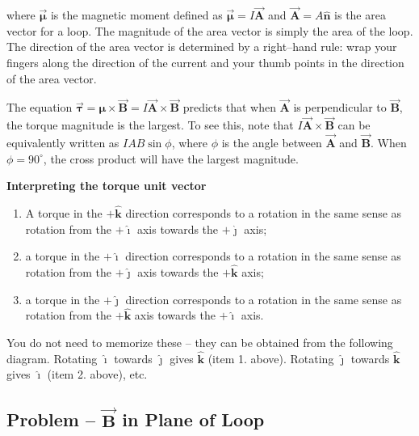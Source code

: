 \documentclass{article}
\newcommand{\ihat}[0]{\hat{\boldsymbol{\imath}}}
\newcommand{\jhat}[0]{\hat{\boldsymbol{\jmath}}}
\newcommand{\khat}[0]{\hat{\boldsymbol{k}}}
\newcommand{\bfvec}[1]{\vec{\mathbf{#1}}}
\begin{document}
where $\vec{\boldsymbol{\mu}}$ is the magnetic moment defined as $\vec{\boldsymbol{\mu}}=I\bfvec{A}$ and $\bfvec{A}=A\hat{\mathbf{n}}$ is the area vector for a loop. The magnitude of the area vector is simply the area of the loop. The direction of the area vector is determined by a right--hand rule: wrap your fingers along the direction of the current and your thumb points in the direction of the area vector.

The equation $\vec{\boldsymbol{\tau}} = \boldsymbol{\mu}\times\bfvec{B} = I\bfvec{A}\times\bfvec{B}$ predicts that when $\bfvec{A}$ is perpendicular to $\bfvec{B}$, the torque magnitude is the largest. To see this, note that $I\bfvec{A}\times\bfvec{B}$ can be equivalently written as $IAB\sin\phi$, where $\phi$ is the angle between $\bfvec{A}$ and $\bfvec{B}$. When $\phi = 90^\circ$, the cross product will have the largest magnitude.

\textbf{Interpreting the torque unit vector}

\begin{enumerate}

  \item A torque in the $+\khat$ direction corresponds to a rotation in the same sense as rotation from the $+\ihat$ axis towards the $+\jhat$ axis;

  \item a torque in the $+\ihat$ direction corresponds to a rotation in the same sense as rotation from the $+\jhat$ axis towards the $+\khat$ axis;

  \item a torque in the $+\jhat$ direction corresponds to a rotation in the same sense as rotation from the $+\khat$ axis towards the $+\ihat$ axis.

\end{enumerate}

You do not need to memorize these -- they can be obtained from the following diagram. Rotating $\ihat$ towards $\jhat$ gives $\khat$ (item 1. above). Rotating $\jhat$ towards $\khat$ gives $\ihat$ (item 2. above), etc.



\ifsolutions

\else

\newpage
\fi

\subsection{Problem -- $\bfvec{B}$ in Plane of Loop}
\end{document}
